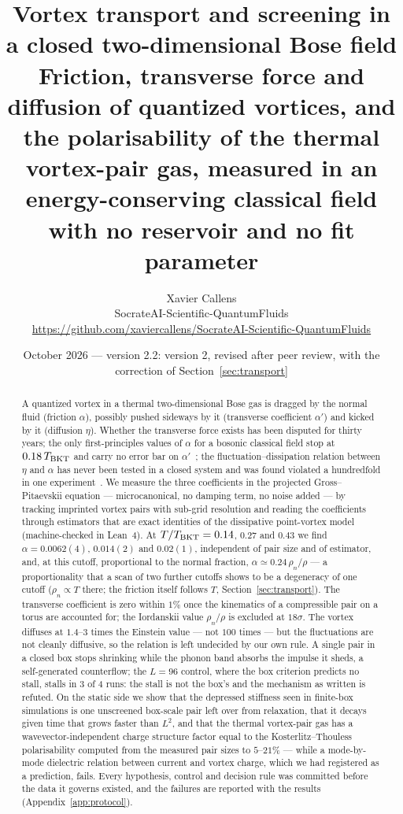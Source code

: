 \documentclass[11pt,a4paper]{article}
\title{\textbf{Vortex transport and screening in a closed two-dimensional Bose field}\\
\large Friction, transverse force and diffusion of quantized vortices, and the polarisability of the thermal
vortex-pair gas, measured in an energy-conserving classical field with no reservoir and no fit parameter}
\author{Xavier Callens\\
\small SocrateAI-Scientific-QuantumFluids\\
\small \url{https://github.com/xaviercallens/SocrateAI-Scientific-QuantumFluids}}
\date{October 2026 --- version 2.2: version 2, revised after peer review, with the correction of Section~\ref{sec:transport}}
\begin{document}
\maketitle

\begin{abstract}
\noindent
A quantized vortex in a thermal two-dimensional Bose gas is dragged by the normal fluid (friction $\alpha$),
possibly pushed sideways by it (transverse coefficient $\alpha'$) and kicked by it (diffusion $\eta$). Whether the
transverse force exists has been disputed for thirty years; the only first-principles values of $\alpha$ for a
bosonic classical field stop at $0.18\,T_{\rm BKT}$ and carry no error bar on $\alpha'$~\cite{Shukla2014}; the
fluctuation--dissipation relation between $\eta$ and $\alpha$ has never been tested in a closed system and was found
violated a hundredfold in one experiment~\cite{Neely2024}. We measure the three coefficients in the projected
Gross--Pitaevskii equation --- microcanonical, no damping term, no noise added --- by tracking imprinted vortex
pairs with sub-grid resolution and reading the coefficients through estimators that are exact identities of the
dissipative point-vortex model (machine-checked in Lean~4). At $T/T_{\rm BKT}=0.14$, $0.27$ and $0.43$ we find
$\alpha=0.0062(4)$, $0.014(2)$ and $0.02(1)$, independent of pair size and of estimator, and, at this cutoff, proportional to the
normal fraction, $\alpha\simeq0.24\,\rho_n/\rho$ --- a proportionality that a scan of two further cutoffs shows to be a degeneracy of one cutoff
($\rho_n\propto T$ there; the friction itself follows $T$, Section~\ref{sec:transport}). The transverse coefficient is zero within $1\%$ once the
kinematics of a compressible pair on a torus are accounted for; the Iordanskii value $\rho_n/\rho$ is excluded at
$18\sigma$. The vortex diffuses at $1.4$--$3$ times the Einstein value --- not $100$ times --- but the fluctuations are
not cleanly diffusive, so the relation is left undecided by our own rule. A single pair in a closed box stops
shrinking while the phonon band absorbs the impulse it sheds, a self-generated counterflow; the $L=96$ control, where the box criterion predicts no stall, stalls in 3 of 4 runs: the stall is not the box's and the mechanism as written is refuted. On the static side we show that the depressed stiffness
seen in finite-box simulations is one unscreened box-scale pair left over from relaxation, that it decays given
time that grows faster than $L^2$, and that the thermal vortex-pair gas has a wavevector-independent charge
structure factor equal to the Kosterlitz--Thouless polarisability computed from the measured pair sizes to
$5$--$21\%$ --- while a mode-by-mode dielectric relation between current and vortex charge, which we had
registered as a prediction, fails. Every hypothesis, control and decision rule was committed before the data it
governs existed, and the failures are reported with the results (Appendix~\ref{app:protocol}).
\end{abstract}
\end{document}
